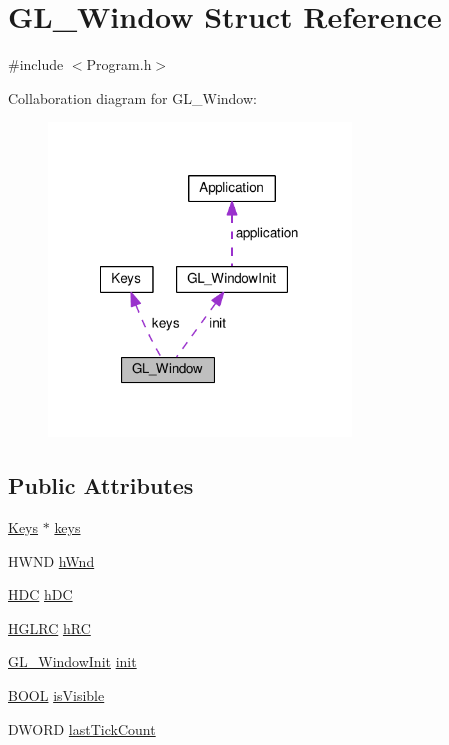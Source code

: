 \hypertarget{struct_g_l___window}{\section{G\+L\+\_\+\+Window Struct Reference}
\label{struct_g_l___window}
}


{\ttfamily \#include $<$Program.\+h$>$}



Collaboration diagram for G\+L\+\_\+\+Window\+:\nopagebreak
\begin{figure}[H]
\begin{center}
\leavevmode
\includegraphics[width=228pt]{struct_g_l___window__coll__graph}
\end{center}
\end{figure}
\subsection*{Public Attributes}
\begin{DoxyCompactItemize}
\item 
\hyperlink{struct_keys}{Keys} $\ast$ \hyperlink{struct_g_l___window_ad0eed98271ddbfb6ab6cf7f12d7b5d02}{keys}
\item 
H\+W\+N\+D \hyperlink{struct_g_l___window_a43e3e57bd7ba1d1e98a8bea7b1ca5bfa}{h\+Wnd}
\item 
\hyperlink{wglext_8h_aaf5a06bd464c6ec72cf68b4819afebe3}{H\+D\+C} \hyperlink{struct_g_l___window_ac968ec84163d9ff1818a6c7ca6f636ab}{h\+D\+C}
\item 
\hyperlink{wglext_8h_ac592fca28a23754f86edf2739d21068c}{H\+G\+L\+R\+C} \hyperlink{struct_g_l___window_a529cfea8e49780d88eb095ff56e4bc5e}{h\+R\+C}
\item 
\hyperlink{struct_g_l___window_init}{G\+L\+\_\+\+Window\+Init} \hyperlink{struct_g_l___window_a509808116a84e361e12666b2d5b5c62f}{init}
\item 
\hyperlink{wglext_8h_a05538ca0e53ef21cb679e6de0fef7f8e}{B\+O\+O\+L} \hyperlink{struct_g_l___window_a6b7dc6064a91f6e7ebf071633f43f90d}{is\+Visible}
\item 
D\+W\+O\+R\+D \hyperlink{struct_g_l___window_af8068e4f9adf4515817a3d72a9cf0d03}{last\+Tick\+Count}
\end{DoxyCompactItemize}


